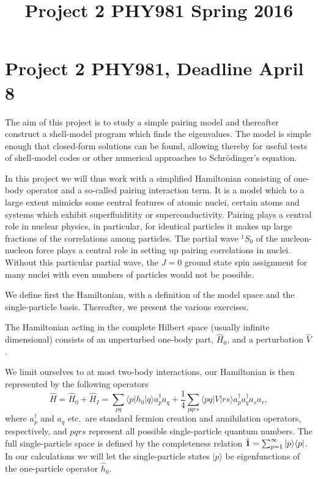 \documentclass[prc]{revtex4}
\begin{document}
\title{Project 2 PHY981 Spring 2016}
\maketitle
\section*{Project 2 PHY981, Deadline April 8}

The aim of this project is to study a simple pairing model and thereafter construct a shell-model program which finds the eigenvalues.
The model is simple enough that closed-form solutions can be found, allowing thereby for useful tests of shell-model codes or other
numerical approaches to Schr\"odinger's equation. 

In this project we will thus work with a simplified Hamiltonian consisting of one-body operator and a so-called 
 pairing interaction term. It is a model which to a large extent mimicks some central features of
atomic nuclei, certain atoms and systems which exhibit superfluiditity or superconductivity.  
Pairing plays a central role in nuclear physics, in particular, for identical particles it makes up large fractions of the correlations among particles. The partial wave $^{1}S_0$ of the nucleon-nucleon force plays a central role in setting up pairing correlations in nuclei. Without this particular partial wave, the $J=0$ ground state spin assignment for many nuclei with even numbers of particles would not be possible. 


We define first the Hamiltonian, with a definition of the model space and
the single-particle basis. Thereafter, we present the various exercises.

The Hamiltonian acting in the complete Hilbert space (usually infinite
dimensional) consists of an unperturbed one-body part, $\hat{H}_0$,
and a perturbation $\hat{V}$. 

We limit ourselves to at most two-body interactions, our Hamiltonian  is 
then represented by the following operators
\begin{equation}
\hat{H} = \hat{H}_0 +\hat{H}_I=\sum_{pq}\langle p |h_0|q\rangle a_{p}^{\dagger}a_{q} +\frac{1}{4}\sum_{pqrs}\langle pq| V|rs\rangle a_{p}^{\dagger}a_{q}^{\dagger}a_{s}a_{r},
\label{eq:hamiltonian}
\end{equation}
where $a_{p}^{\dagger}$ and $a_{q}$ etc.~are standard fermion creation and annihilation operators, respectively,
and $pqrs$ represent all possible single-particle quantum numbers. 
The full single-particle space is defined by the completeness relation
$\hat{{\bf 1}} = \sum_{p =1}^{\infty}|p \rangle \langle p|$.
In our calculations  we will let  the single-particle states $|p\rangle$
be eigenfunctions of  the one-particle operator $\hat{h}_0$. 
\end{document}
